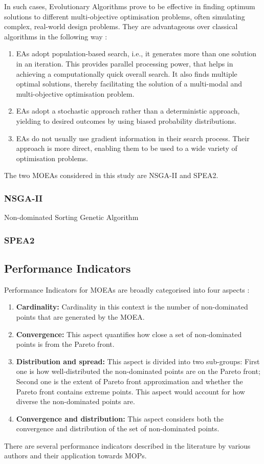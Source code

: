\documentclass[sigconf,nonacm]{acmart}
\begin{document}
In such cases, Evolutionary Algorithms prove to be effective in finding optimum solutions to different multi-objective optimisation problems, often simulating complex, real-world design problems. They are advantageous over classical algorithms in the following way \cite{branke2008}:
\begin{enumerate}
\item EAs adopt population-based search, i.e., it generates more than one solution in an iteration. This provides parallel processing power, that helps in achieving a computationally quick overall search. It also finds multiple optimal solutions, thereby facilitating the solution of a multi-modal and multi-objective optimisation problem.
\item EAs adopt a stochastic approach rather than a deterministic approach, yielding to desired outcomes by using biased probability distributions.
\item EAs do not usually use gradient information in their search process. Their approach is more direct, enabling them to be used to a wide variety of optimisation problems.
\end{enumerate}

The two MOEAs considered in this study are NSGA-II and SPEA2.
\subsubsection{NSGA-II} \label{sec:Background_nsgaii}
Non-dominated Sorting Genetic Algorithm
\subsubsection{SPEA2} \label{sec:Background_spea2}
\subsection{Performance Indicators} \label{sec:Background_PI}
Performance Indicators for MOEAs are broadly categorised into four aspects \cite{audet2021}:
\begin{enumerate}
\item\textbf{Cardinality:} Cardinality in this context is the number of non-dominated points that are generated by the MOEA.
\item\textbf{Convergence:} This aspect quantifies how close a set of non-dominated points is from the Pareto front.
\item\textbf{Distribution and spread:} This aspect is divided into two sub-groups: First one is how well-distributed the non-dominated points are on the Pareto front; Second one is the extent of Pareto front approximation and whether the Pareto front contains extreme points. This aspect would account for how diverse the non-dominated points are.
\item\textbf{Convergence and distribution:} This aspect considers both the convergence and distribution of the set of non-dominated points.
\end{enumerate}
There are several performance indicators described in the literature by various authors and their application towards MOPs. \\
\end{document}
